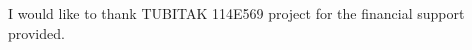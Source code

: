 \documentclass[12pt, a4paper]{report}
\begin{document}
I would like to thank TUBITAK 114E569 project for the financial support provided.


\clearpage

\begin{spacing}{1}
\tableofcontents
\end{spacing}

\clearpage 

\begin{spacing}{1}
\listoffigures
\end{spacing}

\clearpage

\begin{spacing}{1}
\listoftables
\end{spacing}

\clearpage

\begin{spacing}{1}
\listofalgorithms
\end{spacing}


\clearpage
{}



\clearpage


\clearpage



\clearpage


\clearpage


\clearpage


\clearpage


\clearpage


\begin{spacing}{1}

\end{spacing}
\end{document}
